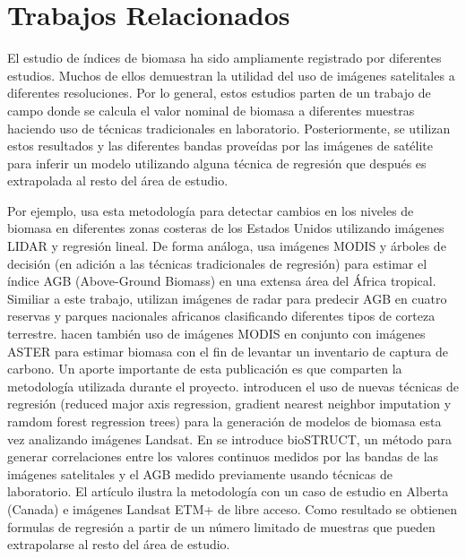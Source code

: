 \section{Trabajos Relacionados}

El estudio de índices de biomasa ha sido ampliamente registrado por diferentes 
estudios. Muchos de ellos demuestran la utilidad del uso de imágenes
satelitales a diferentes resoluciones. Por lo general, estos estudios parten de un 
trabajo de campo donde se calcula el valor nominal de biomasa a diferentes
muestras haciendo uso de técnicas tradicionales en laboratorio. Posteriormente,
se utilizan estos resultados y las diferentes bandas proveídas por las imágenes
de satélite para inferir un modelo utilizando alguna técnica de regresión que
después es extrapolada al resto del área de estudio.

Por ejemplo, \cite{klemas2013remotesensing} usa esta metodología para detectar cambios en
los niveles de biomasa en diferentes zonas costeras de los Estados Unidos utilizando
imágenes LIDAR y regresión lineal. De forma análoga, \cite{baccini2008afirst}
usa imágenes MODIS y árboles de decisión (en adición a las técnicas
tradicionales de regresión) para estimar el índice AGB (Above-Ground Biomass)
en una extensa área del África tropical. Similiar a este trabajo, \cite{mitchard2009usingsatellite}
utilizan imágenes de radar para predecir AGB en cuatro reservas y parques
nacionales africanos clasificando diferentes tipos de corteza terrestre.
\cite{muukkonen2007biomass} hacen también uso de imágenes MODIS en
conjunto con imágenes ASTER para estimar biomasa con el fin de levantar un
inventario de captura de carbono. Un aporte importante de esta publicación es
que comparten la metodología utilizada durante el proyecto. \cite{powell2010quantification}
introducen el uso de nuevas técnicas de regresión (reduced major axis regression,
gradient nearest neighbor imputation y ramdom forest regression trees) para la
generación de modelos de biomasa esta vez analizando imágenes Landsat.
En \cite{hall2006modeling} se introduce bioSTRUCT, un método para generar
correlaciones entre los valores continuos medidos por las bandas de las imágenes
satelitales y el AGB medido previamente usando técnicas de laboratorio. El
artículo ilustra la metodología con un caso de estudio en Alberta (Canada) e
imágenes Landsat ETM+ de libre acceso. Como resultado se obtienen formulas
de regresión a partir de un número limitado de muestras que pueden extrapolarse
al resto del área de estudio.


